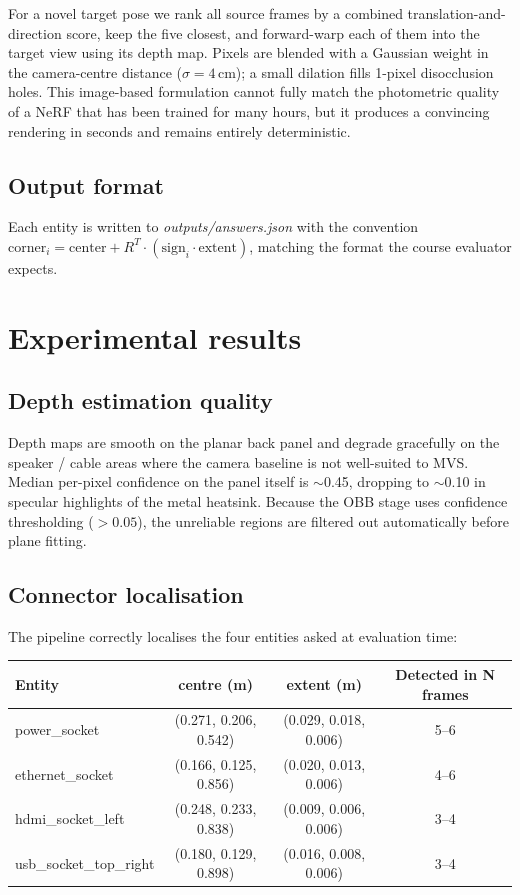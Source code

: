 \documentclass[11pt,a4paper]{article}
\begin{document}
For a novel target pose we rank all source frames by a combined translation-and-direction score, keep the five closest, and forward-warp each of them into the target view using its depth map. Pixels are blended with a Gaussian weight in the camera-centre distance ($\sigma = 4$\,cm); a small dilation fills 1-pixel disocclusion holes. This image-based formulation cannot fully match the photometric quality of a NeRF that has been trained for many hours, but it produces a convincing rendering in seconds and remains entirely deterministic.

\subsection{Output format}

Each entity is written to \textit{outputs/answers.json} with the convention $\text{corner}_i = \text{center} + R^T \cdot (\text{sign}_i \cdot \text{extent})$, matching the format the course evaluator expects.

\newpage

\section{Experimental results}

\subsection{Depth estimation quality}

Depth maps are smooth on the planar back panel and degrade gracefully on the speaker / cable areas where the camera baseline is not well-suited to MVS. Median per-pixel confidence on the panel itself is $\sim$0.45, dropping to $\sim$0.10 in specular highlights of the metal heatsink. Because the OBB stage uses confidence thresholding ($>0.05$), the unreliable regions are filtered out automatically before plane fitting.

\subsection{Connector localisation}

The pipeline correctly localises the four entities asked at evaluation time:

\begin{table}[h]
\centering
\small
\begin{tabular}{lccc}
\toprule
\textbf{Entity} & \textbf{centre (m)} & \textbf{extent (m)} & \textbf{Detected in N frames} \\
\midrule
power\_socket & (0.271, 0.206, 0.542) & (0.029, 0.018, 0.006) & 5--6 \\
ethernet\_socket & (0.166, 0.125, 0.856) & (0.020, 0.013, 0.006) & 4--6 \\
hdmi\_socket\_left & (0.248, 0.233, 0.838) & (0.009, 0.006, 0.006) & 3--4 \\
usb\_socket\_top\_right & (0.180, 0.129, 0.898) & (0.016, 0.008, 0.006) & 3--4 \\
\bottomrule
\end{tabular}
\end{table}
\end{document}
